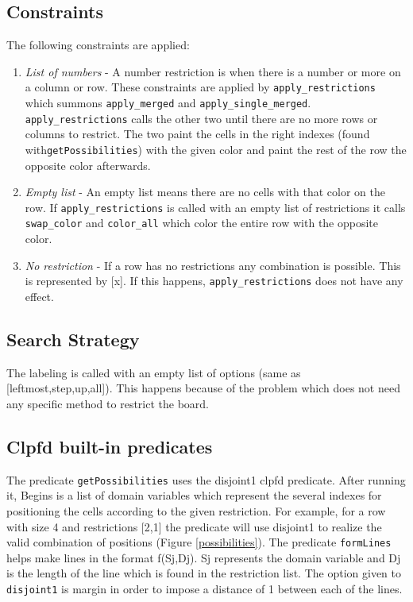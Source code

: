 \documentclass[runningheads,a4paper]{llncs}
\begin{document}
\subsection{Constraints}

	The following constraints are applied:

	\begin{enumerate}
	\item \emph{List of numbers}
		- A number restriction is when there is a number or more on a column or row. These constraints are applied by \verb|apply_restrictions| which summons \verb|apply_merged| and \verb|apply_single_merged|. \verb|apply_restrictions| calls the other two until there are no more rows or columns to restrict. The two paint the cells in the right indexes (found with\verb|getPossibilities|) with the given color and paint the rest of the row the opposite color afterwards. 
	\item \emph{Empty list}
		- An empty list means there are no cells with that color on the row. If \verb|apply_restrictions| is called with an empty list of restrictions it calls \verb|swap_color| and \verb|color_all| which color the entire row with the opposite color.
	\item \emph{No restriction}
		- If a row has no restrictions any combination is possible. This is represented by [x]. If this happens, \verb|apply_restrictions| does not have any effect.
	\end{enumerate}

\subsection{Search Strategy}

	The labeling is called with an empty list of options (same as [leftmost,step,up,all]). This happens because of the problem which does not need any specific method to restrict the board.

\subsection{Clpfd built-in predicates}

	The predicate \verb|getPossibilities| uses the disjoint1 clpfd predicate. After running it, Begins is a list of domain variables which represent the several indexes for positioning the cells according to the given restriction. For example, for a row with size 4 and restrictions [2,1] the predicate will use disjoint1 to realize the valid combination of positions (Figure \ref{possibilities}). The predicate \verb|formLines| helps make lines in the format f(Sj,Dj). Sj represents the domain variable and Dj is the length of the line which is found in the restriction list. The option given to \verb|disjoint1| is margin in order to impose a distance of 1 between each of the lines. 
\end{document}
